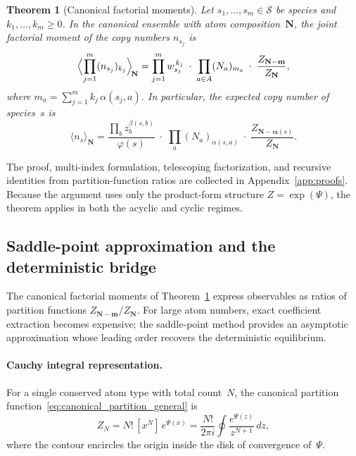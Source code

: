 \documentclass[11pt]{amsart}
\newcommand{\Species}{\mathcal{S}}
\newcommand{\GFensemble}{Z}
\newcommand{\GFcomb}{\Psi}
\theoremstyle{definition}
\theoremstyle{plain}
\newtheorem{theorem}{Theorem}
\theoremstyle{remark}
\begin{document}
\begin{theorem}[Canonical factorial moments]
\label{thm:canonical_factorial_moments}
Let $s_1,\dots,s_m\in\Species$ be species and $k_1,\dots,k_m\ge 0$.
In the canonical ensemble with atom composition~$\mathbf{N}$, the joint factorial moment of the copy numbers $n_{s_j}$ is
\begin{equation}\label{eq:canonical_factorial_moments}
\Bigl\langle \prod_{j=1}^{m}(n_{s_j})_{k_j}\Bigr\rangle_{\!\mathbf{N}}
=
\prod_{j=1}^{m}w_{s_j}^{\,k_j}
\;\cdot\;
\prod_{a\in A}(N_a)_{m_a}
\;\cdot\;
\frac{\GFensemble_{\mathbf{N}-\mathbf{m}}}{\GFensemble_{\mathbf{N}}},
\end{equation}
where $m_a = \sum_{j=1}^{m}k_j\,\alpha(s_j,a)$.
In particular, the expected copy number of species~$s$ is
\begin{equation}\label{eq:canonical_expected_value}
\langle n_s\rangle_{\mathbf{N}}
=
\frac{\prod_{b}z_b^{\beta(s,b)}}{\varphi(s)}
\;\cdot\;
\prod_{a}(N_a)_{\alpha(s,a)}
\;\cdot\;
\frac{\GFensemble_{\mathbf{N}-\boldsymbol{\alpha}(s)}}{\GFensemble_{\mathbf{N}}}.
\end{equation}
\end{theorem}

The proof, multi-index formulation, telescoping factorization, and recursive identities from partition-function ratios are collected in Appendix~\ref{app:proofs}.
Because the argument uses only the product-form structure $\GFensemble=\exp(\GFcomb)$, the theorem applies in both the acyclic and cyclic regimes.


\subsection{Saddle-point approximation and the deterministic bridge}
\label{sec:gf_saddle}

The canonical factorial moments of Theorem~\ref{thm:canonical_factorial_moments} express observables as ratios of partition functions $\GFensemble_{\mathbf{N}-\mathbf{m}}/\GFensemble_{\mathbf{N}}$.
For large atom numbers, exact coefficient extraction becomes expensive; the saddle-point method provides an asymptotic approximation whose leading order recovers the deterministic equilibrium.

\paragraph{Cauchy integral representation.}
For a single conserved atom type with total count~$N$, the canonical partition function~\eqref{eq:canonical_partition_general} is
\begin{equation}\label{eq:cauchy_integral}
\GFensemble_N
= N!\,[x^N]\,e^{\GFcomb(x)}
= \frac{N!}{2\pi i}\oint \frac{e^{\GFcomb(z)}}{z^{N+1}}\,dz,
\end{equation}
where the contour encircles the origin inside the disk of convergence of~$\GFcomb$.
\end{document}
